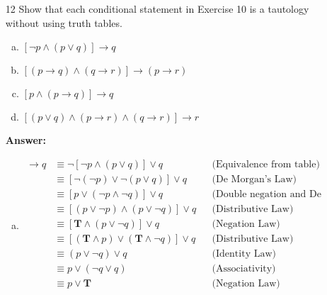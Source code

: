 \begin{itemize}
\begin{enumerate}[a.]
          \end{enumerate}
    \item[12]Show that each conditional statement in Exercise 10 is a tautology without using truth tables.
          \begin{enumerate}[a.]
              \item $[\neg p \land (p \lor q)] \to q$
              \item $[(p \to q) \land (q \to r)] \to (p \to r)$
              \item $[p \land (p \to q)] \to q$
              \item $[(p \lor q) \land (p \to r) \land (q \to r)] \to r$
          \end{enumerate}
          \textbf{Answer:}
          \begin{enumerate}[a.]
              \item \begin{align*}
                        [\neg p \land (p \lor q)] \to q
                         & \equiv \neg[\neg p \land (p \lor q)] \lor q                         &  & \text{(Equivalence from table)}              \\
                         & \equiv [\neg(\neg p) \lor \neg(p \lor q)] \lor q                    &  & \text{(De Morgan's Law)}                     \\
                         & \equiv [p \lor (\neg p \land \neg q)] \lor q                        &  & \text{(Double negation and De Morgan's Law)} \\
                         & \equiv [(p \lor \neg p) \land (p \lor \neg q)] \lor q               &  & \text{(Distributive Law)}                    \\
                         & \equiv [\mathbf{T} \land (p \lor \neg q)] \lor q                    &  & \text{(Negation Law)}                        \\
                         & \equiv [(\mathbf{T} \land p) \lor (\mathbf{T} \land \neg q)] \lor q &  & \text{(Distributive Law)}                    \\
                         & \equiv (p \lor \neg q) \lor q                                       &  & \text{(Identity Law)}                        \\
                         & \equiv p \lor (\neg q \lor q)                                       &  & \text{(Associativity)}                       \\
                         & \equiv p \lor \mathbf{T}                                            &  & \text{(Negation Law)}                        \\

\end{align*}
\end{enumerate}
\end{itemize}
